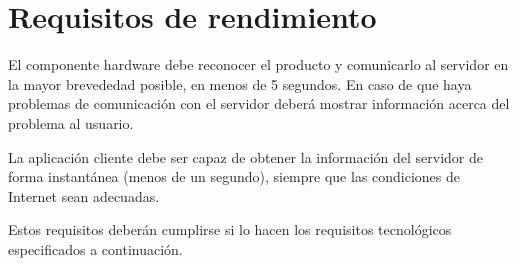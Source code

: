 \section{Requisitos de rendimiento}

El componente hardware debe reconocer el producto y comunicarlo al servidor en la mayor brevededad posible, en menos de 5 segundos. En caso de que haya problemas de comunicación con el servidor deberá mostrar información acerca del problema al usuario.

La aplicación cliente debe ser capaz de obtener la información del servidor de forma instantánea (menos de un segundo), siempre que las condiciones de Internet sean adecuadas.

Estos requisitos deberán cumplirse si lo hacen los requisitos tecnológicos especificados a continuación.
